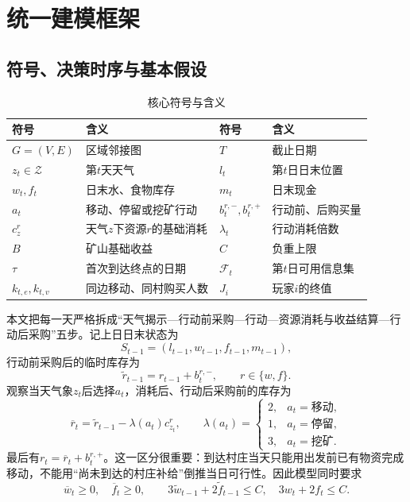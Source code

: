 \section{统一建模框架}

\subsection{符号、决策时序与基本假设}

\begin{table}[H]
\centering
\caption{核心符号与含义}
\label{tab:symbols}
\begin{tabularx}{0.96\textwidth}{C{1.8cm}Y C{1.8cm}Y}
\toprule
符号 & 含义 & 符号 & 含义\\
\midrule
$G=(V,E)$ & 区域邻接图 & $T$ & 截止日期\\
$z_t\in\mathcal Z$ & 第$t$天天气 & $l_t$ & 第$t$日日末位置\\
$w_t,f_t$ & 日末水、食物库存 & $m_t$ & 日末现金\\
$a_t$ & 移动、停留或挖矿行动 & $b_t^{r,-},b_t^{r,+}$ & 行动前、后购买量\\
$c_z^r$ & 天气$z$下资源$r$的基础消耗 & $\lambda_t$ & 行动消耗倍数\\
$B$ & 矿山基础收益 & $C$ & 负重上限\\
$\tau$ & 首次到达终点的日期 & $\mathcal F_t$ & 第$t$日可用信息集\\
$k_{t,e},k_{t,v}$ & 同边移动、同村购买人数 & $J_i$ & 玩家$i$的终值\\
\bottomrule
\end{tabularx}
\end{table}

本文把每一天严格拆成“天气揭示—行动前采购—行动—资源消耗与收益结算—行动后采购”五步。记上日日末状态为
\begin{equation}
S_{t-1}=(l_{t-1},w_{t-1},f_{t-1},m_{t-1}),
\end{equation}
行动前采购后的临时库存为
\begin{equation}
\widetilde r_{t-1}=r_{t-1}+b_t^{r,-},\qquad r\in\{w,f\}.
\label{eq:pre-purchase}
\end{equation}
观察当天气象$z_t$后选择$a_t$，消耗后、行动后采购前的库存为
\begin{equation}
\overline r_t=\widetilde r_{t-1}-\lambda(a_t)c_{z_t}^{r},
\qquad
\lambda(a_t)=
\begin{cases}
2,&a_t=\text{移动},\\
1,&a_t=\text{停留},\\
3,&a_t=\text{挖矿}.
\end{cases}
\label{eq:resource-transition}
\end{equation}
最后有$r_t=\overline r_t+b_t^{r,+}$。这一区分很重要：到达村庄当天只能用出发前已有物资完成移动，不能用“尚未到达的村庄补给”倒推当日可行性。因此模型同时要求
\begin{equation}
\overline w_t\ge0,\quad \overline f_t\ge0,\qquad
3\widetilde w_{t-1}+2\widetilde f_{t-1}\le C,\quad
3w_t+2f_t\le C.
\label{eq:capacity-two-stage}
\end{equation}

